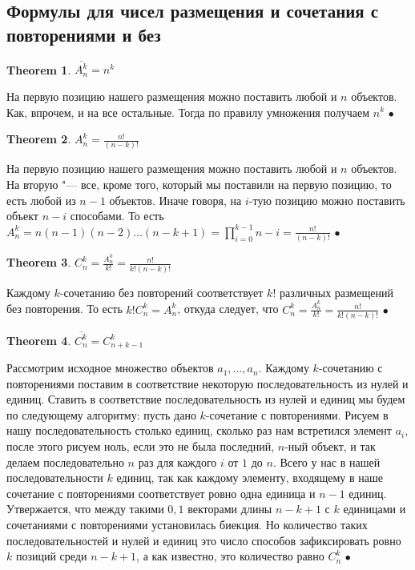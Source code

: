 \documentclass[a4paper]{article}
\theoremstyle{plain}
\newtheorem{theorem}{Theorem}
\theoremstyle{remark}
\theoremstyle{definition}
\renewenvironment{proof}{{\bfseries Proof}}{$\bullet$}
\newcommand{\myprod}{\prod\limits}
\begin{document}
\subsection{Формулы для чисел размещения и сочетания с повторениями и без}
\begin{theorem}
	$\overline{A_n^k} = n^k$
\end{theorem}

\begin{proof}
	На первую позицию нашего размещения можно поставить любой и $n$ объектов. Как, впрочем, и на все остальные. Тогда по правилу умножения получаем $n^k$
\end{proof}

\begin{theorem}
	$A_n^k = \frac{n!}{(n-k)!}$
\end{theorem}

\begin{proof}
	На первую позицию нашего размещения можно поставить любой и $n$ объектов. На вторую "--- все, кроме того, который мы поставили на первую позицию, то есть любой из $n-1$ объектов. Иначе говоря, на $i$-тую позицию можно поставить объект $n-i$ способами. То есть $A_n^k = n(n-1)(n-2) \ldots (n-k+1) = \myprod_{i=0}^{k-1} n-i = \frac{n!}{(n-k)!}$
\end{proof}

\begin{theorem}
	$C_n^k = \frac{A_n^k}{k!} = \frac{n!}{k!(n-k)!}$
\end{theorem}

\begin{proof}
	Каждому $k$-сочетанию без повторений соответствует $k!$ различных размещений без повторения. 
То есть $k! C_n^k = A_n^k$, откуда следует, что $C_n^k = \frac{A_n^k}{k!} = \frac{n!}{k!(n-k)!}$
\end{proof}

\begin{theorem}
	$\overline{C_n^k} = C^k_{n+k-1}$
\end{theorem}

\begin{proof}
	Рассмотрим исходное множество объектов ${a_1, \ldots, a_n}$. 
Каждому $k$-сочетанию с повторениями поставим в соответствие некоторую последовательность из нулей и единиц.
Ставить в соответствие последовательность из нулей и единиц мы будем по следующему алгоритму: пусть дано $k$-сочетание с повторениями.
Рисуем в нашу последовательность столько единиц, сколько раз нам встретился элемент $a_i$, после этого рисуем ноль, если это не была последний, $n$-ный объект, и так делаем последовательно $n$ раз для каждого $i$ от $1$ до $n$.
Всего у нас в нашей последовательности $k$ единиц, так как каждому элементу, входящему в наше сочетание с повторениями соответствует ровно одна единица и $n-1$ единиц. 
Утвержается, что между такими $0,1$ векторами длины $n-k+1$ с $k$ единицами и сочетаниями с повторениями установилась биекция. 
Но количество таких последовательностей и нулей и единиц это число способов зафиксировать ровно $k$ позиций среди $n-k+1$, а как известно, это количество равно $C_n^k$
\end{proof}
\end{document}
